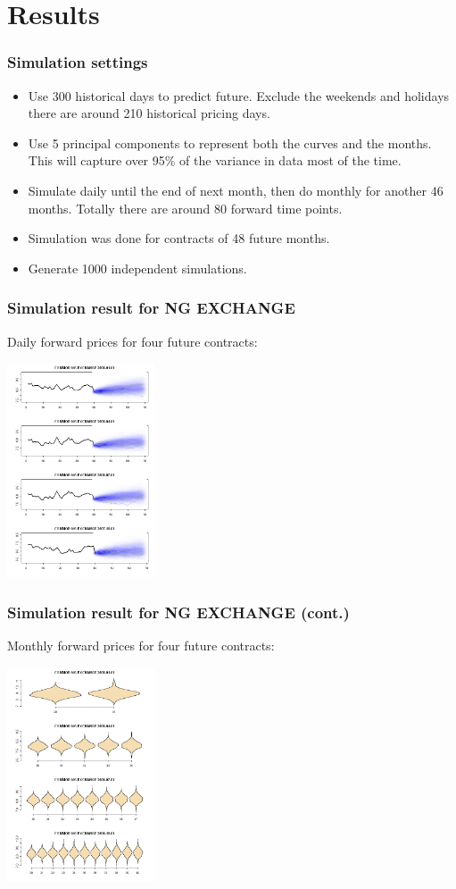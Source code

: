 \documentclass[10pt]{beamer}
\begin{document}

\section{Results}

\frame
{
  \frametitle{Simulation settings}
\begin{itemize}
\item Use 300 historical days to predict future.
Exclude the weekends and holidays there are around 210
historical pricing days.
\item Use 5 principal components to represent both the curves
and the months. This will capture over 95\% of the variance in data
most of the time.
\item Simulate daily until the end of next month, then do monthly
for another 46 months. Totally there are around 80 forward time points.
\item Simulation was done for contracts of 48 future months.
\item Generate 1000 independent simulations.
\end{itemize}

}

\frame
{
  \frametitle{Simulation result for NG EXCHANGE}
Daily forward prices for four future contracts:
\begin{center}
  \includegraphics[height=2.5in]{figures/ng-exchange-allsim.png}
\end{center}
}

\frame
{
  \frametitle{Simulation result for NG EXCHANGE (cont.)}
Monthly forward prices for four future contracts:
\begin{center}
  \includegraphics[height=2.5in]{figures/ng-exchange-violin.png}
\end{center}
}
\end{document}
